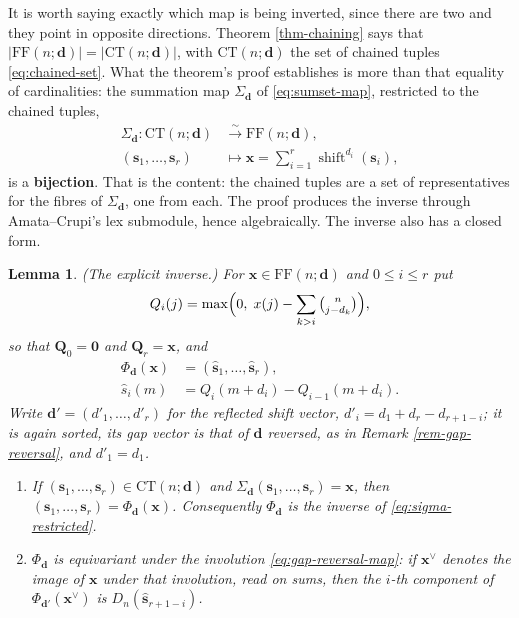 \documentclass[11pt, a4paper, abstract=yes]{scrartcl}
\theoremstyle{definition}
\theoremstyle{remark}
\theoremstyle{plain}
\newtheorem{lemma}[definition]{Lemma}
\newcommand{\vek}[1]{\boldsymbol{#1}}
\newcommand{\shift}{\operatorname{shift}}
\begin{document}
It is worth saying exactly which map is being inverted, since there are two and they point in
opposite directions. Theorem \ref{thm-chaining} says that
\(\lvert\mathrm{FF}(n;\vek d)\rvert=\lvert\mathrm{CT}(n;\vek d)\rvert\), with
\(\mathrm{CT}(n;\vek d)\) the set of chained tuples \eqref{eq:chained-set}. What the theorem's proof
establishes is more than that equality of cardinalities: the summation map \(\Sigma_{\vek d}\) of
\eqref{eq:sumset-map}, restricted to the chained tuples,
\begin{equation}\label{eq:sigma-restricted}
\begin{split}
  \Sigma_{\vek d}\colon\mathrm{CT}(n;\vek d) &\xrightarrow{\ \sim\ } \mathrm{FF}(n;\vek d),\\
  (\vek s_1,\dots,\vek s_r) &\longmapsto \vek x=\sum_{i=1}^{r}\shift^{d_i}(\vek s_i),
\end{split}
\end{equation}
is a \textbf{bijection}. That is the content: the chained tuples are a set of representatives for the fibres
of \(\Sigma_{\vek d}\), one from each. The proof produces the inverse through Amata--Crupi's lex
submodule, hence algebraically. The inverse also has a closed form.

\begin{lemma}
(\emph{The explicit inverse.}) For \(\vek x\in\mathrm{FF}(n;\vek d)\) and \(0\le i\le r\) put
\begin{equation}\label{eq:def-Q}
  Q_i(j)=\max\Bigl(0,\;x(j)-\sum_{k>i}\tbinom n{j-d_k}\Bigr) ,
\end{equation}
so that \(\vek Q_0=\vek 0\) and \(\vek Q_r=\vek x\), and
\begin{align}
  \Phi_{\vek d}(\vek x) &= (\vek{\hat s}_1,\dots,\vek{\hat s}_r),\label{eq:water-filling}\\
  \hat s_i(m) &= Q_i(m+d_i)-Q_{i-1}(m+d_i) .\label{eq:water-filling-component}
\end{align}
Write \(\vek d'=(d'_1,\dots,d'_r)\) for the reflected shift vector, \(d'_i=d_1+d_r-d_{r+1-i}\);
it is again sorted, its gap vector is that of \(\vek d\) reversed, as in
Remark \ref{rem-gap-reversal}, and \(d'_1=d_1\).

\begin{enumerate}
\item If \((\vek s_1,\dots,\vek s_r)\in\mathrm{CT}(n;\vek d)\) and
\(\Sigma_{\vek d}(\vek s_1,\dots,\vek s_r)=\vek x\), then \((\vek s_1,\dots,\vek s_r)=\Phi_{\vek d}(\vek x)\).
Consequently \(\Phi_{\vek d}\) is the inverse of \eqref{eq:sigma-restricted}.
\item \(\Phi_{\vek d}\) is equivariant under the involution \eqref{eq:gap-reversal-map}: if
\(\vek x^{\vee}\) denotes the image of \(\vek x\) under that involution, read on sums, then the
\(i\)-th component of \(\Phi_{\vek d'}(\vek x^{\vee})\) is \(D_n(\vek{\hat s}_{r+1-i})\).
\end{enumerate}
\label{lem-explicit-inverse}
\end{lemma}
\end{document}
